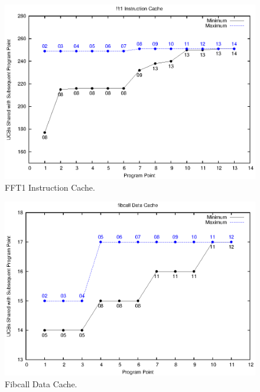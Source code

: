 \begin{figure}[h!]
\begin{center}
\includegraphics[width=\linewidth]{eps/fft1-icache.eps}
\caption{FFT1 Instruction Cache.}
\label{fig:fft1_instruction_cache}
\end{center}
\end{figure}
%
\vspace{-20pt}
\begin{figure}[h!]
\begin{center}
\includegraphics[width=\linewidth]{eps/fibcall-dcache.eps}
\caption{Fibcall Data Cache.}
\label{fig:fibcall_data_cache}
\end{center}
\end{figure}
%
\vspace{-20pt}
